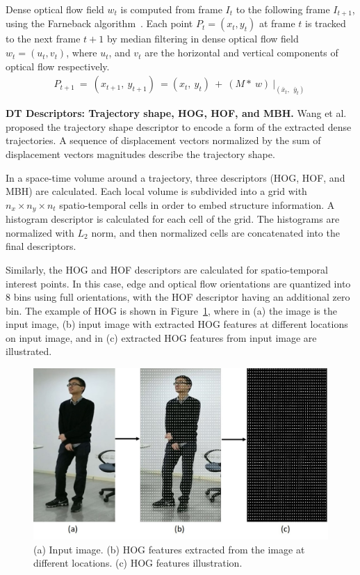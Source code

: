 Dense optical flow field $w_{t}$ is computed from frame $I_{t}$ to the following frame $I_{t+1}$, using the Farneback algorithm~\cite{farneback2003two}. Each point $P_{t} = (x_{t}, y_{t})$ at frame $t$ is tracked to the next frame $t+1$ by median filtering in dense optical flow field $w_{t} = (u_{t}, v_{t})$, where $u_{t}$, and $v_{t}$ are the horizontal and vertical components of optical flow respectively. 
\begin{equation}
\begin{aligned}
P_{t+1}\ =\ (x_{t+1},\ y_{t+1})\ =(x_{t},\ y_{t})\ +\ (M\ast\ w)\ |_{(\bar{x}_t,\ \ \bar{y}_t)}\ 
\end{aligned}
\end{equation}

\noindent
\textbf{DT Descriptors: Trajectory shape, HOG, HOF, and MBH. }
Wang et al.~\cite{wang2013action} proposed the trajectory shape descriptor to encode a form of the extracted dense trajectories. A sequence of displacement vectors normalized by the sum of displacement vectors magnitudes describe the trajectory shape.

In a space-time volume around a trajectory, three descriptors (HOG, HOF, and MBH) are calculated. Each local volume is subdivided into a grid with $ n_{x} \times n_{y} \times n_{t}$ spatio-temporal cells in order to embed structure information. A histogram descriptor is calculated for each cell of the grid. The histograms are normalized with $L_{2}$ norm, and then normalized cells are concatenated into the final descriptors. 

Similarly, the HOG and HOF descriptors are calculated for spatio-temporal interest points. In this case, edge and optical flow orientations are quantized into 8 bins using full orientations, with the HOF descriptor having an additional zero bin. The example of HOG is shown in Figure~\ref{fig:HOG-Example}, where in (a) the image is the input image, (b) input image with extracted HOG features at different locations on input image, and in (c) extracted HOG features from input image are illustrated.


 \begin{figure}[!ht]
	\centering
	\includegraphics[width=.55\textheight]{figures/HOG-final2}
	\linebreak
	\caption{(a) Input image. (b) HOG features extracted from the image at different locations. (c) HOG features illustration.}
	\label{fig:HOG-Example}
\end{figure}


